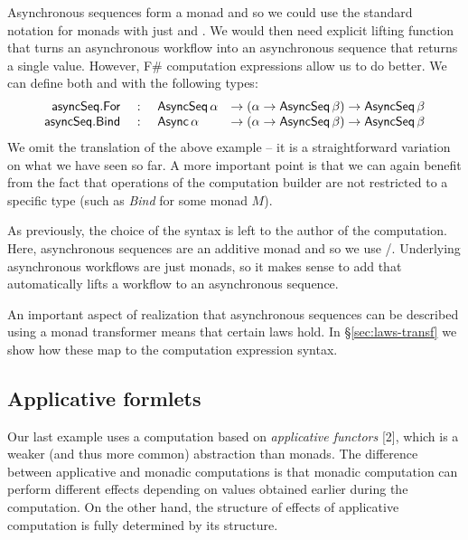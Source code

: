 \documentclass[runningheads,a4paper]{llncs}
\begin{document}
Asynchronous sequences form a monad and so we could use the standard notation for monads with
just  and . We would then need explicit lifting function that turns
an asynchronous workflow into an asynchronous sequence that returns a single value. However,
F\# computation expressions allow us to do better. We can define both  and 
 with the following types:
%
\begin{equation*}
\begin{array}{rcll}
\textnormal{\sffamily asyncSeq}.\textnormal{\sffamily For} &~:~& \textnormal{\sffamily AsyncSeq}\,\alpha &
   \rightarrow (\alpha \rightarrow \textnormal{\sffamily AsyncSeq}\,\beta) \rightarrow \textnormal{\sffamily AsyncSeq}\,\beta\\
\textnormal{\sffamily asyncSeq}.\textnormal{\sffamily Bind} &~:~& \textnormal{\sffamily Async}\,\alpha   &
   \rightarrow (\alpha \rightarrow \textnormal{\sffamily AsyncSeq}\,\beta) \rightarrow \textnormal{\sffamily AsyncSeq}\,\beta\\
\end{array}
\end{equation*}
%
We omit the translation of the above example -- it is a straightforward variation on what we have 
seen so far. A more important point is that we can again benefit from the fact that operations
of the computation builder are not restricted to a specific type (such as \emph{Bind} for some
monad $M$).

As previously, the choice of the syntax is left to the author of the computation. Here, asynchronous
sequences are an additive monad and so we use /. Underlying
asynchronous workflows are just monads, so it makes sense to add  that automatically
lifts a workflow to an asynchronous sequence.

An important aspect of realization that asynchronous sequences can be described using a monad
transformer means that certain laws hold. In \S\ref{sec:laws-transf} we show how these map to the 
computation expression syntax.


\subsection{Applicative formlets}
\label{sec:intro-formlets}

Our last example uses a computation based on \emph{applicative functors} [2], which is a weaker
(and thus more common) abstraction than monads. The difference between applicative and monadic
computations is that monadic computation can perform different effects depending on values
obtained earlier during the computation. On the other hand, the structure of effects of applicative
computation is fully determined by its structure. 
\end{document}

